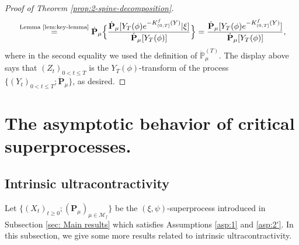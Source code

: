 \documentclass[UTF8]{pkuthss}
\theoremstyle{plain}
\theoremstyle{definition}
\numberwithin{equation}{section}
\begin{document}
\begin{proof}[Proof of Theorem \ref{prop:2-spine-decomposition}]
\[\begin{split}
	&\quad \overset{\text{Lemma \ref{lem:key-lemma}}}{=} \dot{\mathbf P}_{\mu}\Big\{ \frac{\dot {\mathbf P}_\mu[Y_T(\phi)e^{-K^f_{(0, T]}(Y)}|\xi]}{\dot{\mathbf P}_{\mu}[Y_T(\phi)]}\Big\}=\frac{\dot {\mathbf P}_\mu[Y_T(\phi)e^{-K^f_{(0, T]}(Y)}]}{\dot{\mathbf P}_{\mu}[Y_T(\phi)]},
\end{split}\]	
	where in the second equality we used the definition of $\ddot {\mathbb P}_{\mu}^{(T)}$.
	The display above says that $(Z_t)_{0< t\leq T}$ is the $Y_T(\phi)$-transform of the process $\{(Y_t)_{0< t\leq T}; \dot {\mathbf P}_\mu\}$, as desired.
\end{proof}


\section{The asymptotic behavior of critical superprocesses.}\label{sec:asymptotic}

\subsection{Intrinsic ultracontractivity}
\label{sec:further_assumptions}
  Let $\{(X_t)_{t\geq 0}; (\mathbf P_\mu)_{\mu \in \mathcal M_f}\}$ be the $(\xi,\psi)$-superprocess introduced in Subsection \ref{sec: Main results} which satisfies Assumptions \ref{asp:1} and \ref{asp:2'}. 
  In this subsection, we give some more results related to intrinsic ultracontractivity.
\end{document}
